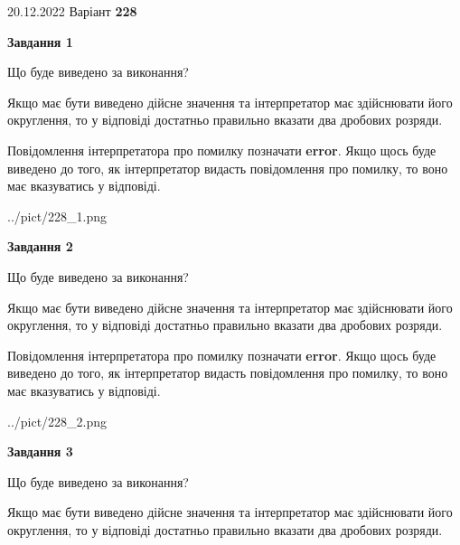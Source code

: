 \documentclass[12pt, ukrainian]{article}
\begin{document}
{20.12.2022 Варіант \No \textbf { 228 }\par}
{
\begin {Large}

{\begin {center}\textbf{Завдання 1}\end {center}}\par
Що буде виведено за виконання? \par

Якщо має бути виведено дійсне значення та інтерпретатор має здійснювати його округлення, 
то у відповіді достатньо правильно вказати два дробових розряди.

Повідомлення інтерпретатора про помилку позначати \textbf{error}.
Якщо щось буде виведено до того, як інтерпретатор видасть повідомлення про помилку, 
то воно має вказуватись у відповіді. \par

\begin{center}
	{../pict/228_1.png}
\end{center}
\newpage

{\begin {center}\textbf{Завдання 2}\end {center}}\par
Що буде виведено за виконання? \par

Якщо має бути виведено дійсне значення та інтерпретатор має здійснювати його округлення, 
то у відповіді достатньо правильно вказати два дробових розряди.

Повідомлення інтерпретатора про помилку позначати \textbf{error}.
Якщо щось буде виведено до того, як інтерпретатор видасть повідомлення про помилку, 
то воно має вказуватись у відповіді. \par

\begin{center}
	{../pict/228_2.png}
\end{center}
\newpage

{\begin {center}\textbf{Завдання 3}\end {center}}\par
Що буде виведено за виконання? \par

Якщо має бути виведено дійсне значення та інтерпретатор має здійснювати його округлення, 
то у відповіді достатньо правильно вказати два дробових розряди.


\end{Large}}
\end{document}
